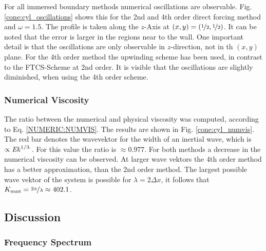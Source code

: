 For all immersed boundary methods numerical oscillations are observable.
Fig. \ref{cone:cyl_oscillations} shows this for the 2nd and 4th order direct forcing method and $\omega=1.5$.
The profile is taken along the $z$-Axis at $(x,y)=(\nicefrac{1}{2},\nicefrac{1}{2})$.
It can be noted that the error is larger in the regions near to the wall.
One important detail is that the oscillations are only observable in $z$-direction, not
in th $(x,y)$ plane.
For the 4th order method the upwinding scheme has been used, in contrast to the FTCS-Scheme at 2nd order.
It is visible that the oscillations are slightly diminished, when using the 4th order scheme.

\subsubsection{Numerical Viscosity}

The ratio between the numerical and physical viscosity was computed, according to Eq. \ref{NUMERIC:NUMVIS}.
The results are shown in Fig. \ref{cone:cyl_numvis}.
The red bar denotes the wavevektor for the width of an inertial wave, which is $\propto \mbox{\textit{Ek}}^{1/3.}$.
For this value the ratio is $\approx{0.977}$.
For both methods a decrease in the numerical viscosity can  be observed.
At larger wave vektors the 4th order method has a better approximation, than the 2nd order method.
The largest possible wave vektor of the  system is possible for $\lambda = 2\Delta x$,
it follows that $K_{\text{max}} = \nicefrac{2\pi}{\lambda} \approx 402.1$.
\clearpage

\subsection{Discussion}

\subsubsection{Frequency Spectrum}

